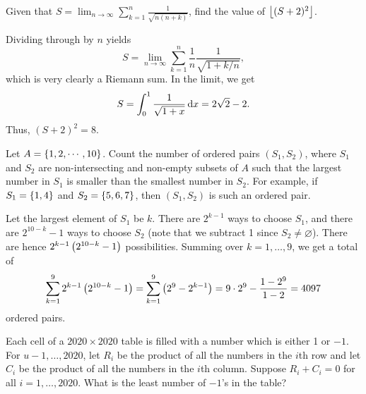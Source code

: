 \begin{question}[8]\label{A::2020-O-1-10}
    Given that $S = \displaystyle\lim_{n \to \infty} \sum_{k=1}^n \frac{1}{\sqrt{n(n+k)}}$, find the value of $\left\lfloor (S+2)^2 \right\rfloor$.
\end{question}

Dividing through by $n$ yields \[S = \lim_{n \to \infty} \sum_{k=1}^n \frac1{n} \frac{1}{\sqrt{1 + k/n}},\] which is very clearly a Riemann sum. In the limit, we get \[S = \int_0^1 \frac1{\sqrt{1 + x}} \mathop{\mathrm{d}x} = 2\sqrt2 - 2.\] Thus, $(S + 2)^2 = 8$.

\begin{question}[4097]\label{A::2020-O-1-11}
    Let $A = \left\lbrace 1, 2, \cdots, 10 \right\rbrace$. Count the number of ordered pairs $(S_1, S_2)$, where $S_1$ and $S_2$ are non-intersecting and non-empty subsets of $A$ such that the largest number in $S_1$ is smaller than the smallest number in $S_2$. For example, if $S_1 = \left\lbrace 1, 4 \right\rbrace$ and $S_2 = \left\lbrace 5, 6, 7 \right\rbrace$, then $(S_1, S_2)$ is such an ordered pair.
\end{question}

Let the largest element of $S_1$ be $k$. There are $2^{k-1}$ ways to choose $S_1$, and there are $2^{10-k} - 1$ ways to choose $S_2$ (note that we subtract 1 since $S_2 \neq \varnothing$). There are hence $2^{k-1} \left( 2^{10-k} - 1 \right)$ possibilities. Summing over $k = 1, \ldots, 9$, we get a total of \[\sum_{k=1}^9 2^{k-1} \left( 2^{10-k} - 1 \right) = \sum_{k=1}^9 \left( 2^9 - 2^{k-1} \right) = 9 \cdot 2^9 - \frac{1-2^9}{1-2} = 4097\] ordered pairs.

\begin{question}[1010]\label{A::2020-O-1-12}
    Each cell of a $2020 \times 2020$ table is filled with a number which is either 1 or $-1$. For $u - 1, \ldots, 2020$, let $R_i$ be the product of all the numbers in the $i$th row and let $C_i$ be the product of all the numbers in the $i$th column. Suppose $R_i + C_i = 0$ for all $i = 1, \ldots, 2020$. What is the least number of $-1$'s in the table?
\end{question}

